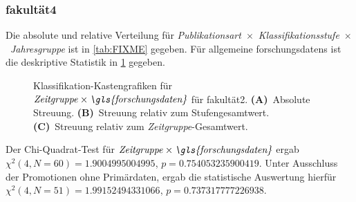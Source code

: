 \subsubsection{\gls{fakultät4}}
Die absolute und relative Verteilung für {\textit{Publikationsart}}~$\times$~{\textit{Klassifikationsstufe}}~$\times$~\textit{Jahresgruppe} ist in \cref{tab:FIXME} gegeben.
Für allgemeine \glspl{forschungsdaten} ist die deskriptive Statistik in \cref{fig:faculty_c_sampled_evaluated_adjusted_factors-only_Zeitgruppe_x_FD_absolute_boxplot} gegeben.
\begin{figure}[!htbp]
    \centering%
    \resizebox{.33\textwidth}{!}{}%
    \resizebox{.33\textwidth}{!}{}%
    \resizebox{.33\textwidth}{!}{}%
    \caption{Klassifikation-Kastengrafiken für $\text{\textit{Zeitgruppe}}\times\text{\textit{\gls{forschungsdaten}}}$ für \gls{fakultät2}. \textbf{(A)}~Absolute Streuung. \textbf{(B)}~Streuung relativ zum Stufengesamtwert. \textbf{(C)}~Streuung relativ zum \textit{Zeitgruppe}-Gesamtwert.}
    \label{fig:faculty_c_sampled_evaluated_adjusted_factors-only_Zeitgruppe_x_FD_absolute_boxplot}
\end{figure}
Der Chi-Quadrat-Test für $\text{\textit{Zeitgruppe}}\times\text{\textit{\gls{forschungsdaten}}}$ ergab $\chi^2 (\num{4}, N = \num{60}) = \num[round-mode=places,round-precision=3]{1.9004995004995}$, $p = \num[round-mode=places,round-precision=3]{0.754053235900419}$.
Unter Ausschluss der Promotionen ohne Primärdaten, ergab die statistische Auswertung hierfür $\chi^2 (\num{4}, N = \num{51}) = \num[round-mode=places,round-precision=3]{1.99152494331066}$, $p = \num[round-mode=places,round-precision=3]{0.737317777226938}$.

